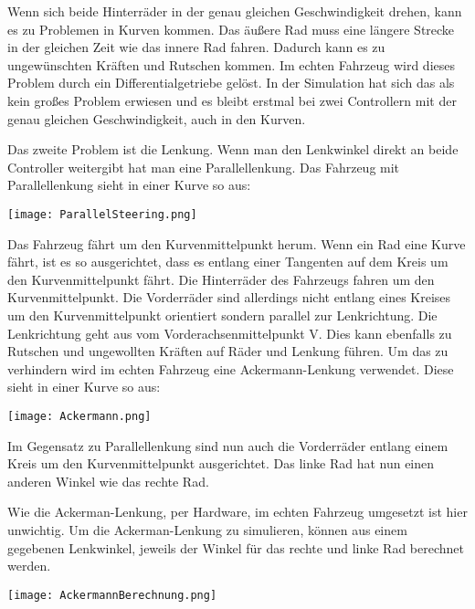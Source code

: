 Wenn sich beide Hinterräder in der genau gleichen Geschwindigkeit drehen, kann es zu Problemen in Kurven kommen.
Das äußere Rad muss eine längere Strecke in der gleichen Zeit wie das innere Rad fahren. 
Dadurch kann es zu ungewünschten Kräften und Rutschen kommen.
Im echten Fahrzeug wird dieses Problem durch ein Differentialgetriebe gelöst.
In der Simulation hat sich das als kein großes Problem erwiesen und es bleibt erstmal bei zwei Controllern mit der genau gleichen Geschwindigkeit, auch in den Kurven.

Das zweite Problem ist die Lenkung. 
Wenn man den Lenkwinkel direkt an beide Controller weitergibt hat man eine Parallellenkung.
Das Fahrzeug mit Parallellenkung sieht in einer Kurve so aus:  
\begin{center}
    \texttt{[image: ParallelSteering.png]}
\end{center}
Das Fahrzeug fährt um den Kurvenmittelpunkt herum. 
Wenn ein Rad eine Kurve fährt, ist es so ausgerichtet, dass es entlang einer Tangenten auf dem Kreis um den Kurvenmittelpunkt fährt.
Die Hinterräder des Fahrzeugs fahren um den Kurvenmittelpunkt.
Die Vorderräder sind allerdings nicht entlang eines Kreises um den Kurvenmittelpunkt orientiert sondern parallel zur Lenkrichtung.
Die Lenkrichtung geht aus vom Vorderachsenmittelpunkt V.
Dies kann ebenfalls zu Rutschen und ungewollten Kräften auf Räder und Lenkung führen.
Um das zu verhindern wird im echten Fahrzeug eine Ackermann-Lenkung verwendet. 
Diese sieht in einer Kurve so aus:
\begin{center}
    \texttt{[image: Ackermann.png]}
\end{center}
Im Gegensatz zu Parallellenkung sind nun auch die Vorderräder entlang einem Kreis um den Kurvenmittelpunkt ausgerichtet.
Das linke Rad hat nun einen anderen Winkel wie das rechte Rad.

Wie die Ackerman-Lenkung, per Hardware, im echten Fahrzeug umgesetzt ist hier unwichtig.
Um die Ackerman-Lenkung zu simulieren, können aus einem gegebenen Lenkwinkel, jeweils der Winkel für das rechte und linke Rad berechnet werden.

\begin{center}
    \texttt{[image: AckermannBerechnung.png]}
\end{center}

